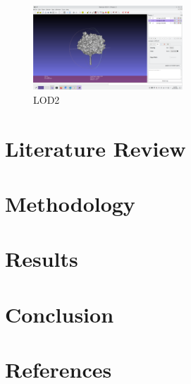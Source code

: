 \documentclass[12pt]{article}
\begin{document}
\begin{figure}[H]
    \vspace{1.5cm}
    \centering
    \includegraphics[width=0.5\textwidth]{images/LOD2.png}
    \caption{LOD2}
\end{figure}


\newpage
\section{Literature Review}

\newpage

\section{Methodology}

\newpage

\section{Results}

\newpage

\section{Conclusion}

\newpage

\section{References}
\nocite{*}


\end{document}

